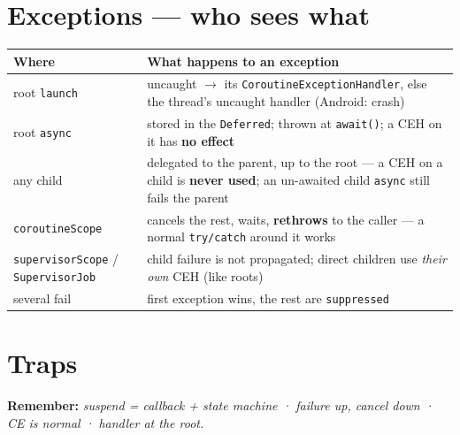 \documentclass[8pt]{extarticle}
\begin{document}
\begin{multicols}{2}
\section{Exceptions — who sees what}
{\scriptsize
\noindent\begin{tabularx}{\linewidth}{@{}>{\raggedright\arraybackslash}p{22mm}L@{}}
\toprule
\textbf{Where} & \textbf{What happens to an exception} \\
\midrule
root \texttt{launch} & uncaught $\to$ its \texttt{CoroutineExceptionHandler}, else the thread's
  uncaught handler (Android: crash) \\
root \texttt{async} & stored in the \texttt{Deferred}; thrown at \texttt{await()};
  a CEH on it has \textbf{no effect} \\
any child & delegated to the parent, up to the root — a CEH on a child is \textbf{never used};
  an un-awaited child \texttt{async} still fails the parent \\
\texttt{coroutineScope} & cancels the rest, waits, \textbf{rethrows} to the caller —
  a normal \texttt{try/catch} around it works \\
\texttt{supervisorScope} / \texttt{SupervisorJob} & child failure is not propagated; direct
  children use \emph{their own} CEH (like roots) \\
several fail & first exception wins, the rest are \texttt{suppressed} \\
\bottomrule
\end{tabularx}}

\section{Traps}
\begin{itemize}\raggedright
\end{itemize}

\textbf{Remember:} \emph{suspend = callback + state machine · failure up, cancel down ·
CE is normal · handler at the root.}


\end{multicols}

\end{document}
